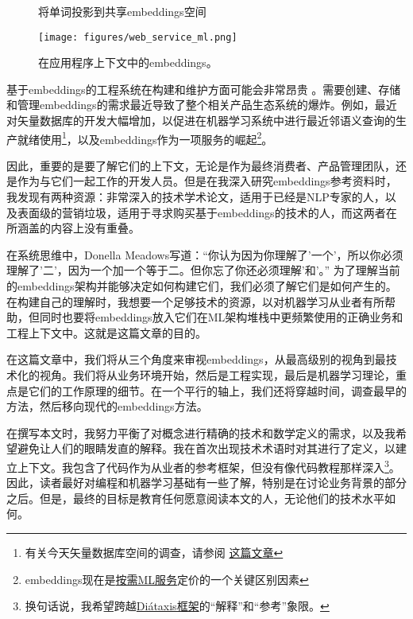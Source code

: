 \documentclass[Chinese, 11pt, table]{diazessay} %
\begin{document}
\begin{CJK}{UTF8}{gbsn}
\begin{sloppypar}
\begin{figure}[H]
\centering
{}
\caption{将单词投影到共享embeddings空间}
\end{figure}

\begin{figure}[H]
\centering
\texttt{[image: figures/web\_service\_ml.png]}
\caption{在应用程序上下文中的embeddings。}
\end{figure}

基于embeddings的工程系统在构建和维护方面可能会非常昂贵 \citep{sharir2020cost}。需要创建、存储和管理embeddings的需求最近导致了整个相关产品生态系统的爆炸。例如，最近对矢量数据库的开发大幅增加，以促进在机器学习系统中进行最近邻语义查询的生产就绪使用\footnote{有关今天矢量数据库空间的调查，请参阅 \href{https://dmitry-kan.medium.com/landscape-of-vector-databases-d241b279f486}{这篇文章}}，以及embeddings作为一项服务的崛起\footnote{embeddings现在是\href{https://openai.com/pricing}{按需ML服务}定价的一个关键区别因素}。

因此，重要的是要了解它们的上下文，无论是作为最终消费者、产品管理团队，还是作为与它们一起工作的开发人员。但是在我深入研究embeddings参考资料时，我发现有两种资源：非常深入的技术学术论文，适用于已经是NLP专家的人，以及表面级的营销垃圾，适用于寻求购买基于embeddings的技术的人，而这两者在所涵盖的内容上没有重叠。

在系统思维中，Donella Meadows写道：“你认为因为你理解了'一个'，所以你必须理解了'二'，因为一个加一个等于二。但你忘了你还必须理解'和'。”\citep{meadows2008thinking} 为了理解当前的embeddings架构并能够决定如何构建它们，我们必须了解它们是如何产生的。在构建自己的理解时，我想要一个足够技术的资源，以对机器学习从业者有所帮助，但同时也要将embeddings放入它们在ML架构堆栈中更频繁使用的正确业务和工程上下文中。这就是这篇文章的目的。

在这篇文章中，我们将从三个角度来审视embeddings，从最高级别的视角到最技术化的视角。我们将从业务环境开始，然后是工程实现，最后是机器学习理论，重点是它们的工作原理的细节。在一个平行的轴上，我们还将穿越时间，调查最早的方法，然后移向现代的embeddings方法。

在撰写本文时，我努力平衡了对概念进行精确的技术和数学定义的需求，以及我希望避免让人们的眼睛发直的解释。我在首次出现技术术语时对其进行了定义，以建立上下文。我包含了代码作为从业者的参考框架，但没有像代码教程那样深入\footnote{换句话说，我希望跨越\href{https://diataxis.fr/}{Diátaxis框架}的“解释”和“参考”象限。}。因此，读者最好对编程和机器学习基础有一些了解，特别是在讨论业务背景的部分之后。但是，最终的目标是教育任何愿意阅读本文的人，无论他们的技术水平如何。


\end{sloppypar}
\end{CJK}
\end{document}
